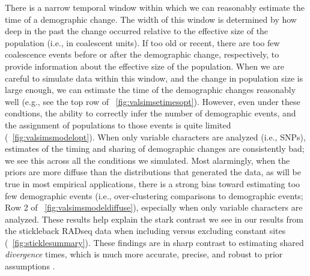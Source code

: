 There is a narrow temporal window within which we can reasonably estimate the
time of a demographic change.
The width of this window is determined by how deep in the past the change
occurred relative to the effective size of the population (i.e., in coalescent
units).
If too old or recent, there are too few coalescence events before or after the
demographic change, respectively, to provide information about the effective
size of the population.
When we are careful to simulate data within this window, and the change in
population size is large enough, we can estimate the time of the demographic
changes reasonably well
(e.g., see the top row of \fig{}~\ref{fig:valsimsetimesopt}).
However, even under these condtions, the ability to correctly infer the number
of demographic events, and the assignment of populations to those events is
quite limited
(\fig{}~\ref{fig:valsimsmodelopt}).
When only variable characters are analyzed (i.e., SNPs), estimates of
the timing and sharing of demographic changes are consistently bad; we see this
across all the conditions we simulated.
Most alarmingly, when the priors are more diffuse than the distributions that
generated the data, as will be true in most empirical applications, there is a
strong bias toward estimating too few demographic events
(i.e., over-clustering comparisons to demographic events;
Row 2 of \fig{}~\ref{fig:valsimsmodeldiffuse}),
especially when only variable characters are analyzed.
These results help explain the stark contrast we see in our results from the
stickleback RADseq data when including versus excluding constant sites
(\fig{}~\ref{fig:sticklesummary}).
These findings are in sharp contrast to estimating shared \emph{divergence}
times, which is much more accurate, precise, and robust to prior assumptions
\citep[\figs {}][]{Oaks2018ecoevolity,Oaks2018paic}.

